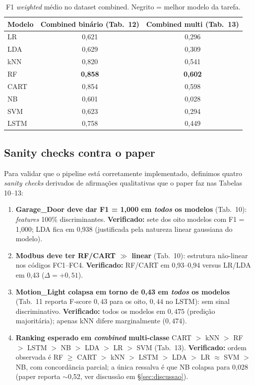 \begin{table}[ht]
  \centering
  \caption{F1 \emph{weighted} médio no dataset combined.
           Negrito = melhor modelo da tarefa.}
  \label{tab:combined}
  \small
  \begin{tabular}{lcc}
    \toprule
    \textbf{Modelo} & \textbf{Combined binário (Tab.\ 12)} & \textbf{Combined multi (Tab.\ 13)} \\
    \midrule
    LR    & 0{,}621 & 0{,}296 \\
    LDA   & 0{,}629 & 0{,}309 \\
    kNN   & 0{,}820 & 0{,}541 \\
    RF    & \textbf{0{,}858} & \textbf{0{,}602} \\
    CART  & 0{,}854 & 0{,}598 \\
    NB    & 0{,}601 & 0{,}028 \\
    SVM   & 0{,}623 & 0{,}294 \\
    LSTM  & 0{,}758 & 0{,}449 \\
    \bottomrule
  \end{tabular}
\end{table}

\subsection{Sanity checks contra o paper}

Para validar que o pipeline está corretamente implementado, definimos
quatro \emph{sanity checks} derivados de afirmações qualitativas que o
paper faz nas Tabelas 10--13:

\begin{enumerate}[leftmargin=*,itemsep=0pt]
  \item \textbf{Garage\_Door deve dar F1 = 1{,}000 em
        \emph{todos} os modelos} (Tab.\ 10): \emph{features}
        100\% discriminantes. \textbf{Verificado:} sete dos oito modelos
        com F1 = 1{,}000; LDA fica em 0{,}938 (justificada pela
        natureza linear gaussiana do modelo).
  \item \textbf{Modbus deve ter RF/CART $\gg$ linear} (Tab.\ 10):
        estrutura não-linear nos códigos FC1--FC4.
        \textbf{Verificado:} RF/CART em 0{,}93--0{,}94 versus LR/LDA
        em 0{,}43 ($\Delta = +0{,}51$).
  \item \textbf{Motion\_Light colapsa em torno de 0{,}43 em
        \emph{todos} os modelos} (Tab.\ 11 reporta F-score $0{,}43$ para
        os oito, $0{,}44$ no LSTM): sem sinal discriminativo.
        \textbf{Verificado:} todos os modelos em $0{,}475$ (predição
        majoritária); apenas kNN difere marginalmente ($0{,}474$).
  \item \textbf{Ranking esperado em \emph{combined} multi-classe}
        CART $>$ kNN $>$ RF $>$ LSTM $>$ NB $>$ LDA $>$
        LR $>$ SVM (Tab.\ 13). \textbf{Verificado:} ordem
        observada é RF $\geq$ CART $>$ kNN $>$ LSTM $>$ LDA $>$
        LR $\approx$ SVM $>$ NB, com concordância parcial; a única ressalva é
        que NB colapsa para 0{,}028 (paper reporta $\sim$0{,}52, ver
        discussão em \S{}\ref{sec:discussao}).
\end{enumerate}

